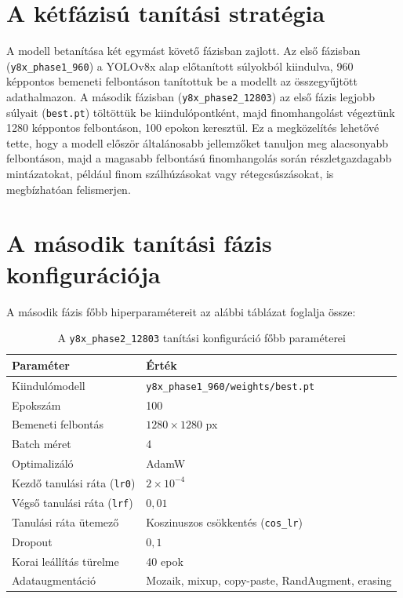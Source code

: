 \section{A kétfázisú tanítási stratégia}

A modell betanítása két egymást követő fázisban zajlott. Az első fázisban (\texttt{y8x\_phase1\_960}) a YOLOv8x alap előtanított
súlyokból kiindulva, 960 képpontos bemeneti felbontáson tanítottuk be a modellt az összegyűjtött adathalmazon. A második
fázisban (\texttt{y8x\_phase2\_12803}) az első fázis legjobb súlyait (\texttt{best.pt}) töltöttük be kiindulópontként, majd
finomhangolást végeztünk 1280 képpontos felbontáson, 100 epokon keresztül. Ez a megközelítés lehetővé tette, hogy a modell
először általánosabb jellemzőket tanuljon meg alacsonyabb felbontáson, majd a magasabb felbontású finomhangolás során
részletgazdagabb mintázatokat, például finom szálhúzásokat vagy rétegcsúszásokat, is megbízhatóan felismerjen.

\section{A második tanítási fázis konfigurációja}

A második fázis főbb hiperparamétereit az alábbi táblázat foglalja össze:

\begin{table}[H]
\centering
\caption{A \texttt{y8x\_phase2\_12803} tanítási konfiguráció főbb paraméterei}
\label{tab:phase2_config}
\renewcommand{\arraystretch}{1.4}
\begin{tabular}{|l|l|}
    \hline
    \textbf{Paraméter} & \textbf{Érték} \\
    \hline
    Kiindulómodell & \texttt{y8x\_phase1\_960/weights/best.pt} \\
    \hline
    Epokszám & 100 \\
    \hline
    Bemeneti felbontás & $1280 \times 1280$ px \\
    \hline
    Batch méret & 4 \\
    \hline
    Optimalizáló & AdamW \\
    \hline
    Kezdő tanulási ráta (\texttt{lr0}) & $2 \times 10^{-4}$ \\
    \hline
    Végső tanulási ráta (\texttt{lrf}) & $0{,}01$ \\
    \hline
    Tanulási ráta ütemező & Koszinuszos csökkentés (\texttt{cos\_lr}) \\
    \hline
    Dropout & $0{,}1$ \\
    \hline
    Korai leállítás türelme & 40 epok \\
    \hline
    Adataugmentáció & Mozaik, mixup, copy-paste, RandAugment, erasing \\
    \hline
\end{tabular}
\end{table}

